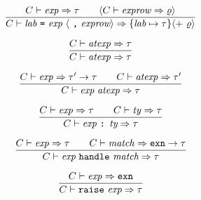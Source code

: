 \begin{equation}	%
\frac{\C\ts\exp\ra\tau\qquad\langle\C\ts\labexps\ra\varrho\rangle}
     {\C\ts\longlabexps\ra\{\lab\mapsto\tau\}\langle +\ \varrho\rangle}\index{27.2}
\end{equation}


%
\begin{equation}	%
\label{atexp-rule}
\frac{\C\ts\atexp\ra\tau}
     {\C\ts\atexp\ra\tau}\index{27.3}
\end{equation}

\begin{equation}	%
\frac{\C\ts\exp\ra\tau'\rightarrow\tau\qquad\C\ts\atexp\ra\tau'}
     {\C\ts\appexp\ra\tau}
\end{equation}

\begin{equation}	%
\label{typedexp-rule}
\frac{\C\ts\exp\ra\tau\qquad\C\ts\ty\ra\tau}
     {\C\ts\typedexp\ra\tau}
\end{equation}

\begin{equation}        %
\frac{\C\ts\exp\ra\tau\qquad\C\ts\match\ra\EXCN\rightarrow\tau}
     {\C\ts\handlexp\ra\tau}
\end{equation}

\begin{equation}        %
\label{raiseexp-rule}
\frac{\C\ts\exp\ra\EXCN}
     {\C\ts\raisexp\ra\tau}
\end{equation}

